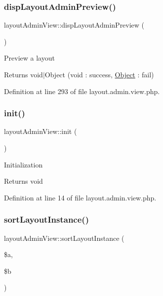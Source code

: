 \hypertarget{classlayoutAdminView_a0c3520a579bb0bbdf1975273c3c6036c}{}\label{classlayoutAdminView_a0c3520a579bb0bbdf1975273c3c6036c} 
\subsubsection{\texorpdfstring{disp\+Layout\+Admin\+Preview()}{dispLayoutAdminPreview()}}
{\footnotesize\ttfamily layout\+Admin\+View\+::disp\+Layout\+Admin\+Preview (\begin{DoxyParamCaption}{ }\end{DoxyParamCaption})}

Preview a layout \begin{DoxyReturn}{Returns}
void$\vert$\+Object (void \+: success, \hyperlink{classObject}{Object} \+: fail) 
\end{DoxyReturn}


Definition at line 293 of file layout.\+admin.\+view.\+php.

\hypertarget{classlayoutAdminView_a572826e03a68707b409298b63d438d5a}{}\label{classlayoutAdminView_a572826e03a68707b409298b63d438d5a} 
\subsubsection{\texorpdfstring{init()}{init()}}
{\footnotesize\ttfamily layout\+Admin\+View\+::init (\begin{DoxyParamCaption}{ }\end{DoxyParamCaption})}

Initialization \begin{DoxyReturn}{Returns}
void 
\end{DoxyReturn}


Definition at line 14 of file layout.\+admin.\+view.\+php.

\hypertarget{classlayoutAdminView_ae962bf1da94055c92d4fbb6a1bc66458}{}\label{classlayoutAdminView_ae962bf1da94055c92d4fbb6a1bc66458} 
\subsubsection{\texorpdfstring{sort\+Layout\+Instance()}{sortLayoutInstance()}}
{\footnotesize\ttfamily layout\+Admin\+View\+::sort\+Layout\+Instance (\begin{DoxyParamCaption}\item[{}]{\$a,  }\item[{}]{\$b }\end{DoxyParamCaption})}

